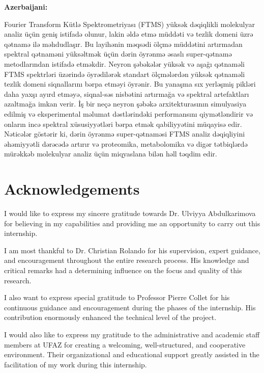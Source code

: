 \documentclass[12pt,a4paper]{report}
\begin{document}
\noindent\textbf{Azerbaijani:}\par
{\azerbaijanifont
Fourier Transform Kütlə Spektrometriyası (FTMS) yüksək dəqiqlikli molekulyar analiz üçün geniş istifadə olunur, lakin əldə etmə müddəti və tezlik domeni üzrə qətnamə ilə məhdudlaşır. Bu layihənin məqsədi ölçmə müddətini artırmadan spektral qətnaməni yüksəltmək üçün dərin öyrənmə əsaslı super-qətnamə metodlarından istifadə etməkdir. Neyron şəbəkələr yüksək və aşağı qətnaməli FTMS spektrləri üzərində öyrədilərək standart ölçmələrdən yüksək qətnaməli tezlik domeni siqnallarını bərpa etməyi öyrənir. Bu yanaşma sıx yerləşmiş pikləri daha yaxşı ayırd etməyə, siqnal-səs nisbətini artırmağa və spektral artefaktları azaltmağa imkan verir. İş bir neçə neyron şəbəkə arxitekturasının simulyasiya edilmiş və eksperimental məlumat dəstlərindəki performansını qiymətləndirir və onların incə spektral xüsusiyyətləri bərpa etmək qabiliyyətini müqayisə edir. Nəticələr göstərir ki, dərin öyrənmə super-qətnaməsi FTMS analiz dəqiqliyini əhəmiyyətli dərəcədə artırır və proteomika, metabolomika və digər tətbiqlərdə mürəkkəb molekulyar analiz üçün miqyaslana bilən həll təqdim edir.
}

\chapter*{Acknowledgements}

\noindent I would like to express my sincere gratitude towards Dr. Ulviyya Abdulkarimova for believing in my capabilities and providing me an opportunity to carry out this internship.

\noindent I am most thankful to Dr. Christian Rolando for his supervision, expert guidance, and encouragement throughout the entire research process. His knowledge and critical remarks had a determining influence on the focus and quality of this research.

\noindent I also want to express special gratitude to Professor Pierre Collet for his continuous guidance and encouragement during the phases of the internship. His contribution enormously enhanced the technical level of the project.

\noindent I would also like to express my gratitude to the administrative and academic staff members at UFAZ for creating a welcoming, well-structured, and cooperative environment. Their organizational and educational support greatly assisted in the facilitation of my work during this internship.
\end{document}
